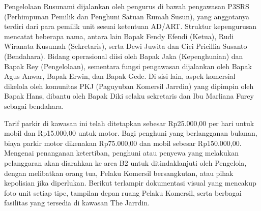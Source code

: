 \vspace{0.5cm} Pengelolaan Rusunami dijalankan oleh pengurus di bawah pengawasan P3SRS (Perhimpunan Pemilik dan Penghuni Satuan Rumah Susun), yang anggotanya terdiri dari para pemilik unit sesuai ketentuan AD/ART. Struktur kepengurusan mencatat beberapa nama, antara lain Bapak Fendy Efendi (Ketua), Rudi Wiranata Kusumah (Sekretaris), serta Dewi Juwita dan Cici Pricillia Susanto (Bendahara). Bidang operasional diisi oleh Bapak Jaka (Kepenghunian) dan Bapak Rey (Pengelolaan), sementara fungsi pengawasan dijalankan oleh Bapak Agus Anwar, Bapak Erwin, dan Bapak Gede. Di sisi lain, aspek komersial dikelola oleh komunitas PKJ (Paguyuban Komersil Jarrdin) yang dipimpin oleh Bapak Hans, dibantu oleh Bapak Diki selaku sekretaris dan Ibu Marliana Furey sebagai bendahara.

\vspace{0.5cm} Tarif parkir di kawasan ini telah ditetapkan sebesar Rp25.000,00 per hari untuk mobil dan Rp15.000,00 untuk motor. Bagi penghuni yang berlangganan bulanan, biaya parkir motor dikenakan Rp75.000,00 dan mobil sebesar Rp150.000,00. Mengenai penanganan ketertiban, penghuni atau penyewa yang melakukan pelanggaran akan diarahkan ke area B2 untuk ditindaklanjuti oleh Pengelola, dengan melibatkan orang tua, Pelaku Komersil bersangkutan, atau pihak kepolisian jika diperlukan. Berikut terlampir dokumentasi visual yang mencakup foto unit setiap tipe, tampilan depan ruang Pelaku Komersil, serta berbagai fasilitas yang tersedia di kawasan The Jarrdin.
        

